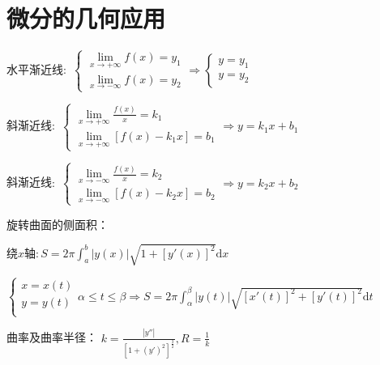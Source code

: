 \section{微分的几何应用}

\begin{spacing}{\hangju}
    \noindent 水平渐近线$\colon$
        $\left\{\begin{aligned}
            \lim\limits_{x \to +\infty}{f(x)} = y_{1} \\
            \lim\limits_{x \to -\infty}{f(x)} = y_{2}
        \end{aligned}\right.
        \Rightarrow
        \left\{\begin{aligned}
            y = y_{1} \\
            y = y_{2}
        \end{aligned}\right.$

    \noindent 斜渐近线$\colon$
        $\begin{cases}
            \lim\limits_{x \to +\infty}{\frac{f(x)}{x}} = k_{1} \\
            \lim\limits_{x \to +\infty}{[f(x) - k_{1}x]} = b_{1}
        \end{cases}
        \Rightarrow y = k_{1}x + b_{1}$

    \noindent 斜渐近线$\colon$
    $\begin{cases}
        \lim\limits_{x \to -\infty}{\frac{f(x)}{x}} = k_{2} \\
        \lim\limits_{x \to -\infty}{[f(x) - k_{2}x]} = b_{2}
    \end{cases}
    \Rightarrow y = k_{2}x + b_{2}$

    \noindent 旋转曲面的侧面积：

    $\mbox{绕}x\mbox{轴}\colon S = 2 \pi \int_{a}^{b}{|y(x)|\sqrt{1 + [y'(x)]^2}\mathrm{d}x}$

    \noindent $\displaystyle
        \left\{
            \begin{array}{l}
                x = x(t) \\
                y = y(t) \\
            \end{array}
        \right.
        \alpha \le t \le \beta
        \Rightarrow
        S = 2 \pi \int_{\alpha}^{\beta} { |y(t)| \sqrt{[x'(t)]^2 + [y'(t)]^2} \mathrm{d} t}$

    \noindent 曲率及曲率半径： $\displaystyle k = \frac{|y''|}{[1 + (y')^2]^{\frac{3}{2}}}, R = \frac{1}{k}$
\end{spacing}
